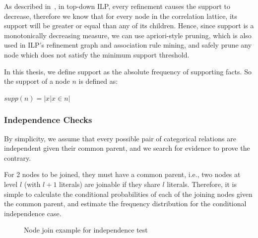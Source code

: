 As described in~\citet{LavracDz94}, in top-down ILP, every refinement causes the support to decrease, therefore we
know that for every node in the correlation lattice, its support will be greater or equal than any of its children.
Hence, since support is a monotonically decreasing measure, we can use apriori-style pruning, which is also used in
ILP's refinement graph and association rule mining, and safely prune any node which does not satisfy the minimum
support threshold.

In this thesis, we define support as the absolute frequency of supporting facts. So the support of a node $n$ is
defined as:

\begin{center}
$supp(n)=|{x|x \in n}|$ 
\end{center}


\subsubsection{Independence Checks}
\label{sec:indepchecks}

By simplicity, we assume that every possible pair of categorical relations are independent given their common parent,
and we search for evidence to prove the contrary.

For 2 nodes to be joined, they must have a common parent, i.e., two nodes at level $l$ (with $l+1$ literals) are
joinable if they share $l$ literals. Therefore, it is simple to calculate the conditional probabilities of each
of the joining nodes given the common parent, and estimate the frequency distribution for the conditional independence
case.

 
\begin{figure}[!h]
  \caption{Node join example for independence test}
  \centering
  \label{fig:joinIndepExample}
\end{figure}

